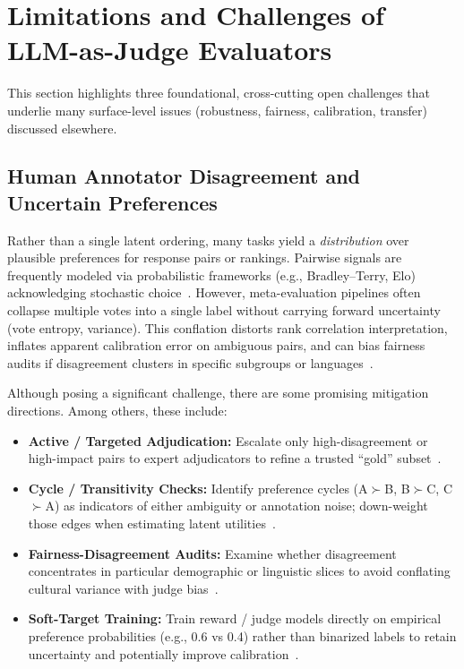 
\section{Limitations and Challenges of LLM-as-Judge Evaluators}
This section highlights three foundational, cross-cutting open challenges that underlie many surface-level issues (robustness, fairness, calibration, transfer) discussed elsewhere.

\subsection{Human Annotator Disagreement and Uncertain Preferences}
Rather than a single latent ordering, many tasks yield a \emph{distribution} over plausible preferences for response pairs or rankings. Pairwise signals are frequently modeled via probabilistic frameworks (e.g., Bradley--Terry, Elo) acknowledging stochastic choice~\cite{bradley1952rank, elo1978rating, liu2024pairs}. However, meta-evaluation pipelines often collapse multiple votes into a single label without carrying forward uncertainty (vote entropy, variance). This conflation distorts rank correlation interpretation, inflates apparent calibration error on ambiguous pairs, and can bias fairness audits if disagreement clusters in specific subgroups or languages~\cite{hada2024metal, liang2022helm}.

Although posing a significant challenge, there are some promising mitigation directions. Among others, these include:
\begin{itemize}
	\item \textbf{Active / Targeted Adjudication:} Escalate only high-disagreement or high-impact pairs to expert adjudicators to refine a trusted ``gold'' subset~\cite{stiennon2020learning, ouyang2022training}.
	\item \textbf{Cycle / Transitivity Checks:} Identify preference cycles (A$\succ$B, B$\succ$C, C$\succ$A) as indicators of either ambiguity or annotation noise; down-weight those edges when estimating latent utilities~\cite{bradley1952rank, liu2024pairs}.
	\item \textbf{Fairness-Disagreement Audits:} Examine whether disagreement concentrates in particular demographic or linguistic slices to avoid conflating cultural variance with judge bias~\cite{hada2024metal, liang2022helm}.
	\item \textbf{Soft-Target Training:} Train reward / judge models directly on empirical preference probabilities (e.g., 0.6 vs 0.4) rather than binarized labels to retain uncertainty and potentially improve calibration~\cite{stiennon2020learning, ouyang2022training}.
\end{itemize}

